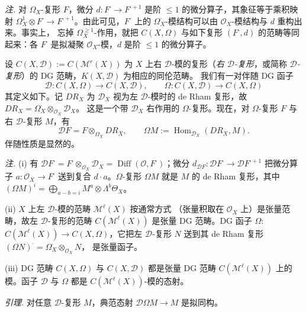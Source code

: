 \emph{注.} 对 $\Omega_X$-复形 $F$，微分 $d:F^{\cdot}\to F^{\cdot+1}$
是阶 $\le1$ 的微分算子，其象征等于乘积映射
$\Omega_X^1\otimes F^{\cdot}\to F^{\cdot+1}$。由此可见，$F^{\cdot}$ 上的
$\Omega_X^{\cdot}$-模结构可以由 $\mathcal{O}_X$-模结构与 $d$ 重构出来。事实上，
忘掉 $\Omega_X^{\ge1}$-作用，就把 $C(X,\Omega)$ 与如下复形 $(F^{\cdot},d)$
的范畴等同起来：各 $F^{\cdot}$ 是拟凝聚 $\mathcal{O}_X$-模，$d$ 是阶 $\le1$
的微分算子。

 设 $C(X,\mathcal{D}):=C(\mathcal{M}^{r}(X))$ 为 $X$ 上右
$\mathcal{D}$-模的复形（\emph{右 $\mathcal{D}$-复形}，或简称
\emph{$\mathcal{D}$-复形}）的 DG 范畴，$K(X,\mathcal{D})$ 为相应的同伦范畴。
我们有一对伴随 DG 函子
\begin{equation}\tag{306}
\mathcal{D}:C(X,\Omega)\longrightarrow C(X,\mathcal{D}),
\qquad
\Omega:C(X,\mathcal{D})\longrightarrow C(X,\Omega)
\end{equation}
其定义如下。记 $DR_X$ 为 $\mathcal{D}_X$ 视为左 $\mathcal{D}$-模时的 de Rham
复形，故 $DR_X=\Omega_X^{\cdot}\otimes_{\mathcal{O}_X}\mathcal{D}_X$。
这是一个带 $\mathcal{D}_X$ 右作用的 $\Omega$-复形。现在，对 $\Omega$-复形 $F$
与右 $\mathcal{D}$-复形 $M$，有
\begin{equation}\tag{307}
\mathcal{D}F=F\otimes_{\Omega_X}DR_X,
\qquad
\Omega M:=\operatorname{Hom}_{\mathcal{D}_X}(DR_X,M).
\end{equation}
伴随性质是显然的。

 \emph{注.} (i) 有
$\mathcal{D}F^{\cdot}=F^{\cdot}\otimes_{\mathcal{O}_X}\mathcal{D}_X
=\operatorname{Diff}(\mathcal{O},F^{\cdot})$；微分
$d_{\mathcal{D}F}:\mathcal{D}F^{\cdot}\to\mathcal{D}F^{\cdot+1}$ 把微分算子
$a:\mathcal{O}_X\to F^{\cdot}$ 送到复合 $d\cdot a$。$\Omega$-复形 $\Omega M$
就是 $M$ 的 de Rham 复形，其中
$(\Omega M)^i=\bigoplus_{a-b=i}M^a\otimes\Lambda^b\Theta_X$。

(ii) $X$ 上左 $\mathcal{D}$-模的范畴 $\mathcal{M}^{\ell}(X)$ 按通常方式
（张量积取在 $\mathcal{O}_X$ 上）是张量范畴，故左 $\mathcal{D}$-复形的范畴
$C(\mathcal{M}^{\ell}(X))$ 是张量 DG 范畴。DG 函子 $\Omega:$%
%
$C(\mathcal{M}^{\ell}(X))\to C(X,\Omega)$，它把左 $\mathcal{D}$-复形 $N$ 送到其
de Rham 复形 $(\Omega N)^{\cdot}=\Omega_X^{\cdot}\otimes_{\mathcal{O}_X}N$，
是张量函子。

(iii) DG 范畴 $C(X,\Omega)$ 与 $C(X,\mathcal{D})$ 都是张量 DG 范畴
$C(\mathcal{M}^{\ell}(X))$ 上的模。函子 $\mathcal{D}$ 与 $\Omega$ 都是
$C(\mathcal{M}^{\ell}(X))$-模的态射。

 \emph{引理.} 对任意 $\mathcal{D}$-复形 $M$，典范态射
$\mathcal{D}\Omega M\to M$ 是拟同构。

